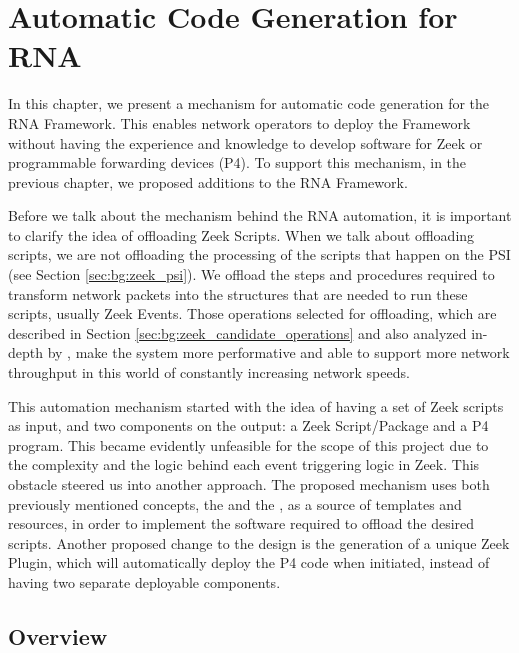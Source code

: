 \chapter{Automatic Code Generation for RNA}
\label{cap:code_gen}



In this chapter, we present a mechanism for automatic code generation for the RNA Framework. This enables network operators to deploy the Framework without having the experience and knowledge to develop software for Zeek or programmable forwarding devices (P4). To support this mechanism, in the previous chapter, we proposed additions to the RNA Framework.

Before we talk about the mechanism behind the RNA automation, it is important to clarify the idea of offloading Zeek Scripts. When we talk about offloading scripts, we are not offloading the processing of the scripts that happen on the PSI (see Section \ref{sec:bg:zeek_psi}). We offload the steps and procedures required to transform network packets into the structures that are needed to run these scripts, usually Zeek Events. Those operations selected for offloading, which are described in Section \ref{sec:bg:zeek_candidate_operations} and also analyzed in-depth by , make the system more performative and able to support more network throughput in this world of constantly increasing network speeds.

This automation mechanism started with the idea of having a set of Zeek scripts as input, and two components on the output: a Zeek Script/Package and a P4 program. This became evidently unfeasible for the scope of this project due to the complexity and the logic behind each event triggering logic in Zeek. This obstacle steered us into another approach. The proposed mechanism uses both previously mentioned concepts, the \ProtocolTemplates{} and the \Offloaders{}, as a source of templates and resources, in order to implement the software required to offload the desired scripts. Another proposed change to the design is the generation of a unique Zeek Plugin, which will automatically deploy the P4 code when initiated, instead of having two separate deployable components.

\section{Overview}
\label{sec:code_gen:overview}

